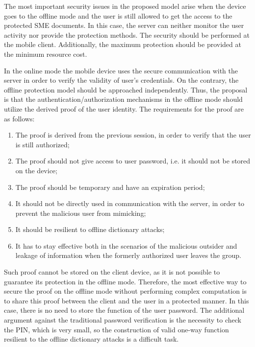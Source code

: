 \documentclass[twocolumn]{svjour3}          %
\begin{document}
The most important security issues in the proposed model arise when the device goes to the offline mode and the user is still allowed to get the access to the protected SME documents. In this case, the server can neither monitor the user activity nor provide the protection methods. The security should be performed at the mobile client. Additionally, the maximum protection should be provided at the minimum resource cost. 

In the online mode the mobile device uses the secure communication with the server in order to verify the validity of user’s credentials. On the contrary, the offline protection model should be approached independently. Thus, the proposal is that the authentication/authorization mechanisms in the offline mode should utilize the derived proof of the user identity. The requirements for the proof are as follows:

\begin{enumerate}
	\item The proof is derived from the previous session, in order to verify that the user is still authorized;
	\item The proof should not give access to user password, i.e. it should not be stored on the device;
	\item The proof should be temporary and have an expiration period;
	\item It should not be directly used in communication with the server, in order to prevent the malicious user from mimicking;
	\item It should be resilient to offline dictionary attacks;
	\item It has to stay effective both in the scenarios of the malicious outsider and leakage of information when the formerly authorized user leaves the group.
\end{enumerate}

Such proof cannot be stored on the client device, as it is not possible to guarantee its protection in the offline mode. Therefore, the most effective way to secure the proof on the offline mode without performing complex computation is to share this proof between the client and the user in a protected manner. In this case, there is no need to store the function of the user password. The additional argument against the traditional password verification is the necessity to check the PIN, which is very small, so the construction of valid one-way function resilient to the offline dictionary attacks is a difficult task.
\end{document}
